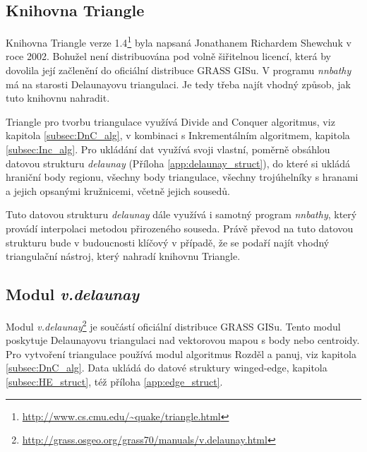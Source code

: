 \documentclass[12pt,a4paper]{article}
\begin{document}
\newpage
\subsection{Knihovna Triangle}

Knihovna Triangle verze
1.4\footnote{\url{http://www.cs.cmu.edu/~quake/triangle.html}} byla napsaná
Jonathanem Richardem Shewchuk v roce 2002. Bohužel není distribuována pod
volně šiřitelnou licencí, která by dovolila její začlenění do oficiální distribuce GRASS
GISu. V programu \emph{nnbathy} má na starosti Delaunayovu
triangulaci. Je tedy třeba najít vhodný způsob, jak tuto knihovnu
nahradit.

Triangle pro tvorbu triangulace využívá Divide and Conquer algoritmus,
viz kapitola \ref{subsec:DnC_alg}, v kombinaci s Inkrementálním
algoritmem, kapitola \ref{subsec:Inc_alg}. Pro ukládání dat využívá
svoji vlastní, poměrně obsáhlou datovou strukturu \emph{delaunay}
(Příloha \ref{app:delaunay_struct}), do které si ukládá hraniční body
regionu, všechny body triangulace, všechny trojúhelníky s hranami a
jejich opsanými kružnicemi, včetně jejich sousedů.

Tuto datovou strukturu \emph{delaunay} dále využívá i samotný program
\emph{nnbathy}, který provádí interpolaci metodou přirozeného
souseda. Právě převod na tuto datovou strukturu bude v budoucnosti
klíčový v případě, že se podaří najít vhodný triangulační nástroj,
který nahradí knihovnu Triangle.

\newpage
\subsection{Modul \emph{v.delaunay}}
\label{subsec:v.delaunay}

Modul
\emph{v.delaunay}\footnote{\url{http://grass.osgeo.org/grass70/manuals/v.delaunay.html}}
je součástí oficiální distribuce GRASS GISu. Tento modul poskytuje
Delaunayovu triangulaci nad vektorovou mapou s body nebo
centroidy. Pro vytvoření triangulace používá modul algoritmus Rozděl a
panuj, viz kapitola \ref{subsec:DnC_alg}. Data ukládá do datové
struktury winged-edge, kapitola \ref{subsec:HE_struct}, též příloha \ref{app:edge_struct}.
\end{document}
